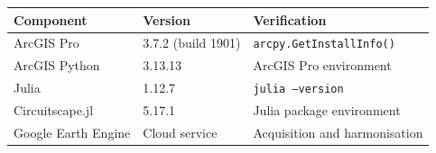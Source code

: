 \begin{tabular}{lll}
\toprule
Component & Version & Verification\\
\midrule
ArcGIS Pro & 3.7.2 (build 1901) & \texttt{arcpy.GetInstallInfo()}\\
ArcGIS Python & 3.13.13 & ArcGIS Pro environment\\
Julia & 1.12.7 & \texttt{julia --version}\\
Circuitscape.jl & 5.17.1 & Julia package environment\\
Google Earth Engine & Cloud service & Acquisition and harmonisation\\
\bottomrule
\end{tabular}
